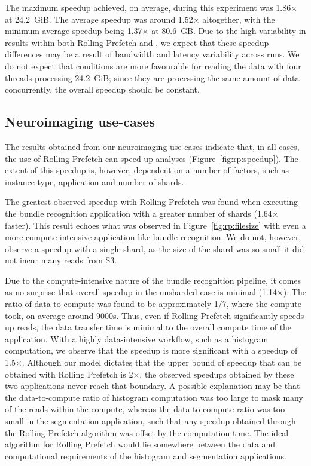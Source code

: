 The maximum speedup achieved, on average, during this experiment was
1.86$\times$ at 24.2~GiB. The average speedup was around 1.52$\times$
altogether, with the minimum average speedup being 1.37$\times$ at 80.6~GB. Due
to the high variability in results within both Rolling Prefetch and \sfs, we
expect that these speedup differences may be a result of bandwidth and latency
variability across runs. We do not expect that conditions are more favourable
for reading the data with four threads processing 24.2~GiB; since they are
processing the same amount of data concurrently, the overall speedup should be
constant.

\subsection{Neuroimaging use-cases}

The results obtained from our neuroimaging use cases indicate that, in all
cases, the use of Rolling Prefetch can speed up analyses
(Figure~\ref{fig:rp:speedup}). The extent of this speedup is, however, dependent on
a number of factors, such as instance type, application and number of shards.

The greatest observed speedup with Rolling Prefetch was found when executing the
bundle recognition application with a greater number of shards (1.64$\times$
faster). This result echoes what was observed in Figure~\ref{fig:rp:filesize} with
even a more compute-intensive application like bundle recognition. We do not,
however, observe a speedup with a single shard, as the size of the shard was so
small it did not incur many reads from S3.

Due to the compute-intensive nature of the bundle recognition pipeline, it comes
as no surprise that overall speedup in the unsharded case is minimal
(1.14$\times$). The ratio of data-to-compute was found to be approximately 1/7,
where the compute took, on average around 9000s. Thus, even if Rolling Prefetch
significantly speeds up reads, the data transfer time is minimal to the overall
compute time of the application. With a highly data-intensive workflow, such as
a histogram computation, we observe that the speedup is more significant with a
speedup of 1.5$\times$. Although our model dictates that the upper bound of
speedup that can be obtained with Rolling Prefetch is 2$\times$, the observed
speedups obtained by these two applications never reach that boundary. A
possible explanation may be that the data-to-compute ratio of histogram
computation was too large to mask many of the reads within the compute, whereas
the data-to-compute ratio was too small in the segmentation application, such
that any speedup obtained through the Rolling Prefetch algorithm was offset by
the computation time. The ideal algorithm for Rolling Prefetch would lie
somewhere between the data and computational requirements of the histogram and
segmentation applications.

